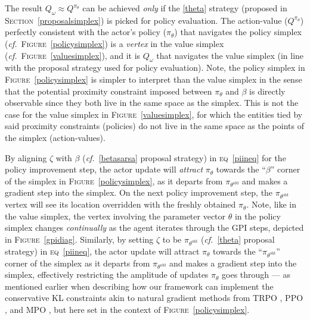 The result $Q_\omega \approx Q^{\pi_\theta}$ can be achieved \emph{only}
if the \ref{theta} strategy (proposed in \textsc{Section}~\ref{proposalsimplex})
is picked for policy evaluation.
The action-value ($Q^{\pi_\theta}$) perfectly consistent with the actor's policy ($\pi_\theta$)
that navigates the policy simplex (\textit{cf.}~\textsc{Figure}~\ref{policysimplex})
is a \emph{vertex} in the value simplex (\textit{cf.}~\textsc{Figure}~\ref{valuesimplex}),
and it is $Q_\omega$ that navigates the value simplex
(in line with the proposal strategy used for policy evaluation).
Note, the policy simplex in \textsc{Figure}~\ref{policysimplex}
is simpler to interpret than the value simplex in the sense that the potential
proximity constraint imposed between $\pi_\theta$ and $\beta$ is directly observable since they both live in the
same space as the simplex.
This is not the case for the value simplex in \textsc{Figure}~\ref{valuesimplex}, for which the entities tied by
said proximity constraints (policies) do not live in the same space as the points of the simplex (action-values).

By aligning $\zeta$ with $\beta$ (\textit{cf.}~\ref{betasarsa} proposal strategy)
in \textsc{eq}~\ref{piineq} for the policy improvement step,
the actor update will \emph{attract} $\pi_\theta$ towards
the ``$\beta$'' corner of the simplex in \textsc{Figure}~\ref{policysimplex},
as it departs from $\pi_{\theta^\text{old}}$ and
makes a gradient step into the simplex.
On the next policy improvement step, the $\pi_{\theta^\text{old}}$ vertex will see its location overridden with
the freshly obtained $\pi_\theta$.
Note, like in the value simplex, the vertex involving
the parameter vector $\theta$ in the policy simplex
changes \emph{continually} as the agent iterates through the GPI steps, depicted in
\textsc{Figure}~\ref{gpidiag}.
Similarly, by setting $\zeta$ to be $\pi_{\theta^\text{old}}$
(\textit{cf.}~\ref{theta} proposal strategy)
in \textsc{eq}~\ref{piineq},
the actor update will attract $\pi_\theta$ towards
the ``$\pi_{\theta^\text{old}}$'' corner of the simplex
as it departs from $\pi_{\theta^\text{old}}$ and
makes a gradient step into the simplex,
effectively restricting the amplitude of updates $\pi_\theta$ goes through
--- as mentioned earlier when describing how our framework can implement the conservative KL constraints
akin to natural gradient \cite{Amari2016-hl, Kakade2001-hw, Peters2008-mw}
methods
from TRPO \cite{Schulman2015-jt},
PPO \cite{Schulman2017-ou},
and MPO \cite{Abdolmaleki2018-sp},
but here set in the context of \textsc{Figure}~\ref{policysimplex}.

